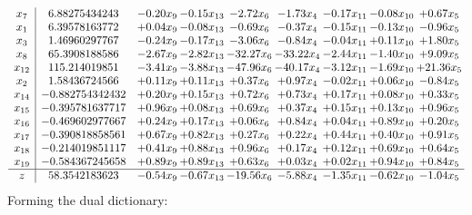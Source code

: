 \documentclass[8pt]{article}
\begin{document}
\[\begin{array}{c| c c@{\hskip 2pt} c@{\hskip 2pt} c@{\hskip 2pt} c@{\hskip 2pt} c@{\hskip 2pt} c@{\hskip 2pt} c@{\hskip 2pt} }
 x_{7}   &  6.88275434243 & -0.20 x_{9} & -0.15 x_{13} & -2.72 x_{6} & -1.73 x_{4} & -0.17 x_{11} & -0.08 x_{10} & +  0.67 x_{5}\\
 x_{1}   &  6.39578163772 & +  0.04 x_{9} & -0.08 x_{13} & -0.69 x_{6} & -0.37 x_{4} & -0.15 x_{11} & -0.13 x_{10} & -0.96 x_{5}\\
 x_{3}   &  1.46960297767 & -0.24 x_{9} & -0.17 x_{13} & -3.06 x_{6} & -0.84 x_{4} & -0.04 x_{11} & +  0.11 x_{10} & +  1.80 x_{5}\\
 x_{8}   &  65.3908188586 & -2.67 x_{9} & -2.82 x_{13} & -32.27 x_{6} & -33.22 x_{4} & -2.44 x_{11} & -1.40 x_{10} & +  9.09 x_{5}\\
 x_{12}   &  115.214019851 & -3.41 x_{9} & -3.88 x_{13} & -47.96 x_{6} & -40.17 x_{4} & -3.12 x_{11} & -1.69 x_{10} & + 21.36 x_{5}\\
 x_{2}   &  1.58436724566 & +  0.11 x_{9} & +  0.11 x_{13} & +  0.37 x_{6} & +  0.97 x_{4} & -0.02 x_{11} & +  0.06 x_{10} & -0.84 x_{5}\\
 x_{14}   &  -0.882754342432 & +  0.20 x_{9} & +  0.15 x_{13} & +  0.72 x_{6} & +  0.73 x_{4} & +  0.17 x_{11} & +  0.08 x_{10} & +  0.33 x_{5}\\
 x_{15}   &  -0.395781637717 & +  0.96 x_{9} & +  0.08 x_{13} & +  0.69 x_{6} & +  0.37 x_{4} & +  0.15 x_{11} & +  0.13 x_{10} & +  0.96 x_{5}\\
 x_{16}   &  -0.469602977667 & +  0.24 x_{9} & +  0.17 x_{13} & +  0.06 x_{6} & +  0.84 x_{4} & +  0.04 x_{11} & +  0.89 x_{10} & +  0.20 x_{5}\\
 x_{17}   &  -0.390818858561 & +  0.67 x_{9} & +  0.82 x_{13} & +  0.27 x_{6} & +  0.22 x_{4} & +  0.44 x_{11} & +  0.40 x_{10} & +  0.91 x_{5}\\
 x_{18}   &  -0.214019851117 & +  0.41 x_{9} & +  0.88 x_{13} & +  0.96 x_{6} & +  0.17 x_{4} & +  0.12 x_{11} & +  0.69 x_{10} & +  0.64 x_{5}\\
 x_{19}   &  -0.584367245658 & +  0.89 x_{9} & +  0.89 x_{13} & +  0.63 x_{6} & +  0.03 x_{4} & +  0.02 x_{11} & +  0.94 x_{10} & +  0.84 x_{5}\\
\hline
z    &  58.3542183623 & -0.54 x_{9} & -0.67 x_{13} & -19.56 x_{6} & -5.88 x_{4} & -1.35 x_{11} & -0.62 x_{10} & -1.04 x_{5}\\
\end{array}\]
Forming the dual dictionary:
\end{document}
